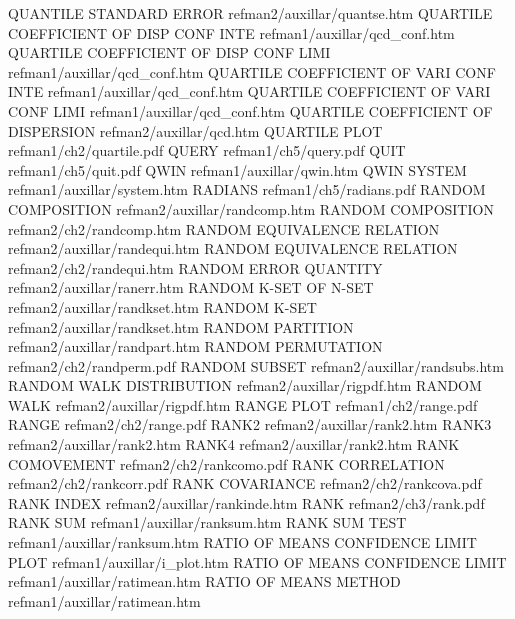 QUANTILE STANDARD ERROR                 refman2/auxillar/quantse.htm
QUARTILE COEFFICIENT OF DISP CONF INTE  refman1/auxillar/qcd_conf.htm
QUARTILE COEFFICIENT OF DISP CONF LIMI  refman1/auxillar/qcd_conf.htm
QUARTILE COEFFICIENT OF VARI CONF INTE  refman1/auxillar/qcd_conf.htm
QUARTILE COEFFICIENT OF VARI CONF LIMI  refman1/auxillar/qcd_conf.htm
QUARTILE COEFFICIENT OF DISPERSION      refman2/auxillar/qcd.htm
QUARTILE PLOT                           refman1/ch2/quartile.pdf
QUERY                                   refman1/ch5/query.pdf
QUIT                                    refman1/ch5/quit.pdf
QWIN                                    refman1/auxillar/qwin.htm
QWIN SYSTEM                             refman1/auxillar/system.htm
RADIANS                                 refman1/ch5/radians.pdf
RANDOM COMPOSITION                      refman2/auxillar/randcomp.htm
RANDOM COMPOSITION                      refman2/ch2/randcomp.htm
RANDOM EQUIVALENCE RELATION             refman2/auxillar/randequi.htm
RANDOM EQUIVALENCE RELATION             refman2/ch2/randequi.htm
RANDOM ERROR QUANTITY                   refman2/auxillar/ranerr.htm
RANDOM K-SET OF N-SET                   refman2/auxillar/randkset.htm
RANDOM K-SET                            refman2/auxillar/randkset.htm
RANDOM PARTITION                        refman2/auxillar/randpart.htm
RANDOM PERMUTATION                      refman2/ch2/randperm.pdf
RANDOM SUBSET                           refman2/auxillar/randsubs.htm
RANDOM WALK DISTRIBUTION                refman2/auxillar/rigpdf.htm
RANDOM WALK                             refman2/auxillar/rigpdf.htm
RANGE PLOT                              refman1/ch2/range.pdf
RANGE                                   refman2/ch2/range.pdf
RANK2                                   refman2/auxillar/rank2.htm
RANK3                                   refman2/auxillar/rank2.htm
RANK4                                   refman2/auxillar/rank2.htm
RANK COMOVEMENT                         refman2/ch2/rankcomo.pdf
RANK CORRELATION                        refman2/ch2/rankcorr.pdf
RANK COVARIANCE                         refman2/ch2/rankcova.pdf
RANK INDEX                              refman2/auxillar/rankinde.htm
RANK                                    refman2/ch3/rank.pdf
RANK SUM                                refman1/auxillar/ranksum.htm
RANK SUM TEST                           refman1/auxillar/ranksum.htm
RATIO OF MEANS CONFIDENCE LIMIT PLOT    refman1/auxillar/i_plot.htm
RATIO OF MEANS CONFIDENCE LIMIT         refman1/auxillar/ratimean.htm
RATIO OF MEANS METHOD                   refman1/auxillar/ratimean.htm
